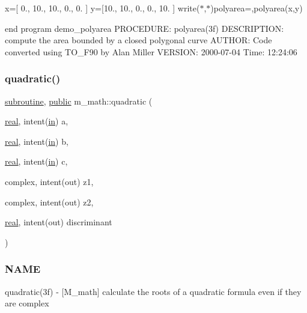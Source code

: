 x=\mbox{[} 0., 10., 10., 0., 0. \mbox{]} y=\mbox{[}10., 10., 0., 0., 10. \mbox{]} write($\ast$,$\ast$)\textquotesingle{}polyarea=\textquotesingle{},polyarea(x,y)

end program demo\+\_\+polyarea P\+R\+O\+C\+E\+D\+U\+RE\+: polyarea(3f) D\+E\+S\+C\+R\+I\+P\+T\+I\+ON\+: compute the area bounded by a closed polygonal curve A\+U\+T\+H\+OR\+: Code converted using T\+O\+\_\+\+F90 by Alan Miller V\+E\+R\+S\+I\+ON\+: 2000-\/07-\/04 Time\+: 12\+:24\+:06 \mbox{\label{namespacem__math_a59bbb085b083b802178b8de41c9bb343}} 
\subsubsection{\texorpdfstring{quadratic()}{quadratic()}}
{\footnotesize\ttfamily \hyperlink{M__stopwatch_83_8txt_acfbcff50169d691ff02d4a123ed70482}{subroutine}, \hyperlink{M__stopwatch_83_8txt_a2f74811300c361e53b430611a7d1769f}{public} m\+\_\+math\+::quadratic (\begin{DoxyParamCaption}\item[{\hyperlink{read__watch_83_8txt_abdb62bde002f38ef75f810d3a905a823}{real}, intent(\hyperlink{M__journal_83_8txt_afce72651d1eed785a2132bee863b2f38}{in})}]{a,  }\item[{\hyperlink{read__watch_83_8txt_abdb62bde002f38ef75f810d3a905a823}{real}, intent(\hyperlink{M__journal_83_8txt_afce72651d1eed785a2132bee863b2f38}{in})}]{b,  }\item[{\hyperlink{read__watch_83_8txt_abdb62bde002f38ef75f810d3a905a823}{real}, intent(\hyperlink{M__journal_83_8txt_afce72651d1eed785a2132bee863b2f38}{in})}]{c,  }\item[{complex, intent(out)}]{z1,  }\item[{complex, intent(out)}]{z2,  }\item[{\hyperlink{read__watch_83_8txt_abdb62bde002f38ef75f810d3a905a823}{real}, intent(out)}]{discriminant }\end{DoxyParamCaption})}



\subsubsection*{N\+A\+ME}

quadratic(3f) -\/ \mbox{[}M\+\_\+math\mbox{]} calculate the roots of a quadratic formula even if they are complex 


